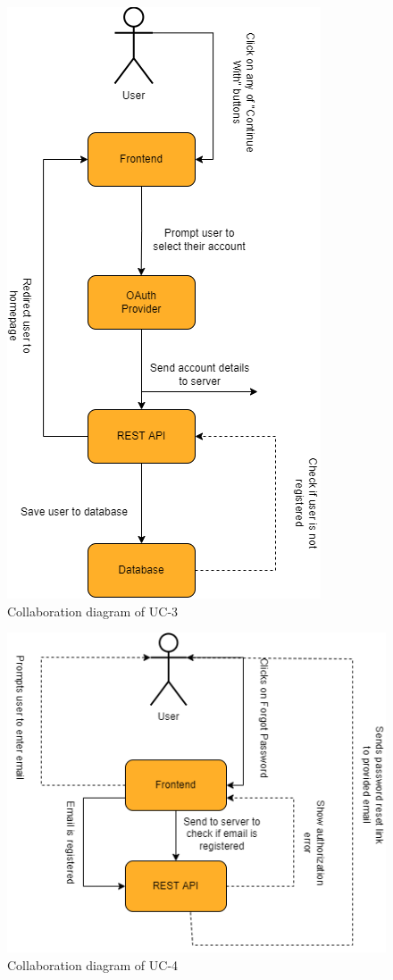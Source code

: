 \begin{figure}[H]
    \centering
    \includegraphics[scale=0.5]{./diagrams/collaboration/cd-3.png}
    \caption{Collaboration diagram of UC-3}
    \label{fig:cd-03}
    
\end{figure}


\begin{figure}[H]
    \centering
    \includegraphics[scale=0.5]{./diagrams/collaboration/cd-4.png}
    \caption{Collaboration diagram of UC-4}
    \label{fig:cd-04}
    
\end{figure}



